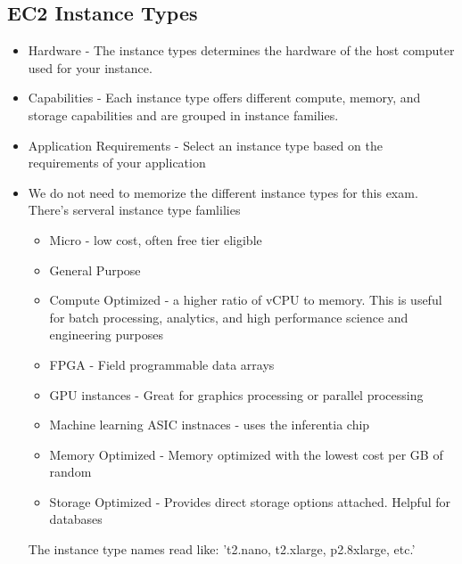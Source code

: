 \documentclass{article}%
\begin{document}
\subsection{EC2 Instance Types}
\begin{itemize}
    \item Hardware - The instance types determines the hardware of the host computer used for your instance.
    \item Capabilities - Each instance type offers different compute, memory, and storage capabilities and are grouped in instance families.
    \item Application Requirements - Select an instance type based on the requirements of your application 
    \item We do not need to memorize the different instance types for this exam. There's serveral instance type famlilies
    \begin{itemize}
        \item Micro - low cost, often free tier eligible
        \item General Purpose
        \item Compute Optimized - a higher ratio of vCPU to memory. This is useful for batch processing, analytics, and high performance science and engineering purposes
        \item FPGA - Field programmable data arrays
        \item GPU instances - Great for graphics processing or parallel processing
        \item Machine learning ASIC instnaces - uses the inferentia chip 
        \item Memory Optimized - Memory optimized with the lowest cost per GB of random
        \item Storage Optimized - Provides direct storage options attached. Helpful for databases
    \end{itemize}
The instance type names read like: 't2.nano, t2.xlarge, p2.8xlarge, etc.'
\end{itemize}
\end{document}
